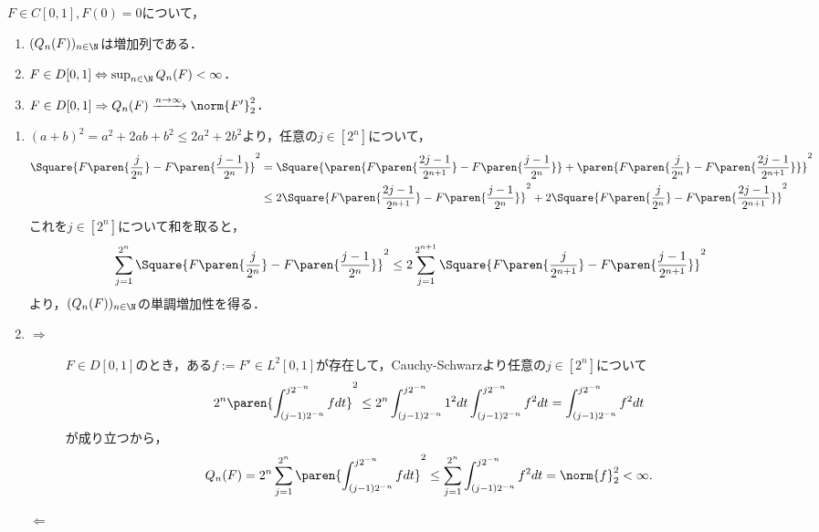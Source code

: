 \documentclass[uplatex,dvipdfmx]{jsreport}
\begin{document}
\begin{lemma}
    $F\in C[0,1],F(0)=0$について，
    \begin{enumerate}
        \item $(Q_n(F))_{n\in\N}$は増加列である．
        \item $F\in D[0,1]\Leftrightarrow\sup_{n\in\N}Q_n(F)<\infty$．
        \item $F\in D[0,1]\Rightarrow Q_n(F)\xrightarrow{n\to\infty}\norm{F'}^2_2$．
    \end{enumerate}
\end{lemma}
\begin{Proof}\mbox{}
    \begin{enumerate}
        \item $(a+b)^2=a^2+2ab+b^2\le 2a^2+2b^2$より，任意の$j\in[2^n]$について，
        \begin{align*}
            \Square{F\paren{\frac{j}{2^n}}-F\paren{\frac{j-1}{2^n}}}^2&=\Square{\paren{F\paren{\frac{2j-1}{2^{n+1}}}-F\paren{\frac{j-1}{2^n}}}+\paren{F\paren{\frac{j}{2^n}}-F\paren{\frac{2j-1}{2^{n+1}}}}}^2\\
            &\le2\Square{F\paren{\frac{2j-1}{2^{n+1}}}-F\paren{\frac{j-1}{2^n}}}^2+2\Square{F\paren{\frac{j}{2^n}}-F\paren{\frac{2j-1}{2^{n+1}}}}^2
        \end{align*}
        これを$j\in[2^n]$について和を取ると，
        \[\sum^{2^n}_{j=1}\Square{F\paren{\frac{j}{2^n}}-F\paren{\frac{j-1}{2^n}}}^2\le 2\sum^{2^{n+1}}_{j=1}\Square{F\paren{\frac{j}{2^{n+1}}}-F\paren{\frac{j-1}{2^{n+1}}}}^2\]
        より，$(Q_n(F))_{n\in\N}$の単調増加性を得る．
        \item \begin{description}
            \item[$\Rightarrow$] $F\in D[0,1]$のとき，ある$f:=F'\in L^2[0,1]$が存在して，Cauchy-Schwarzより任意の$j\in[2^n]$について
            \[2^n\paren{\int^{j2^{-n}}_{(j-1)2^{-n}}fdt}^2\le 2^n\int^{j2^{-n}}_{(j-1)2^{-n}}1^2dt\int^{j2^{-n}}_{(j-1)2^{-n}}f^2dt=\int^{j2^{-n}}_{(j-1)2^{-n}}f^2dt\]
            が成り立つから，
            \[Q_n(F)=2^n\sum^{2^n}_{j=1}\paren{\int^{j2^{-n}}_{(j-1)2^{-n}}fdt}^2\le \sum^{2^n}_{j=1}\int^{j2^{-n}}_{(j-1)2^{-n}}f^2dt=\norm{f}_2^2<\infty.\]
            \item[$\Leftarrow$]

        \end{description}
    \end{enumerate}
\end{Proof}
\end{document}
